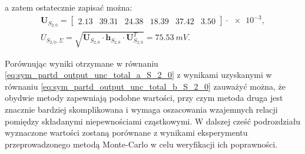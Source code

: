 a zatem ostatecznie zapisać można:
\begin{gather}
\mathbf{U}_{S_{2,0}} =
\begin{bmatrix}
\num{2.13} & \num{39.31} & \num{24.38} & \num{18.39} & \num{37.42} & \num{3.50}
\end{bmatrix} \cdot \num{e-3}
\label{eq:sym_partd_output_unc_sumuvectval_S_2_0}, \\
U_{S_{2,0},\Sigma} = \sqrt{\mathbf{U}_{S_{2,0}} \cdot \mathbf{h}_{S_{2,0}} \cdot \mathbf{U}_{S_{2,0}}^{T}} = \qty{75.53}{mV} \label{eq:sym_partd_output_unc_total_b_S_2_0}.
\end{gather}

Porównując wyniki otrzymane w równaniu \eqref{eq:sym_partd_output_unc_total_a_S_2_0} z wynikami uzyskanymi w równaniu \eqref{eq:sym_partd_output_unc_total_b_S_2_0} zauważyć można, że obydwie metody zapewniają podobne wartości, przy czym metoda druga jest znacznie bardziej skomplikowana i wymaga oszacowania wzajemnych relacji pomiędzy składanymi niepewnościami cząstkowymi. W dalszej cześć podrozdziału wyznaczone wartości zostaną porównane z wynikami eksperymentu przeprowadzonego metodą Monte-Carlo w celu weryfikacji ich poprawności.

